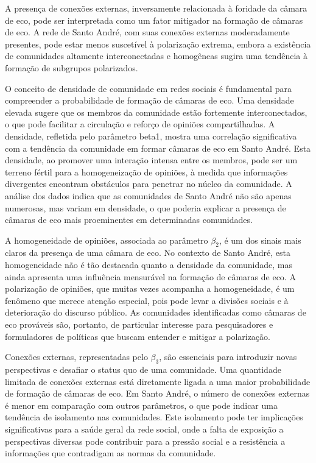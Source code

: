 A presença de conexões externas, inversamente relacionada à foridade da câmara de eco, pode ser interpretada como um fator mitigador na formação de câmaras de eco. A rede de Santo André, com suas conexões externas moderadamente presentes, pode estar menos suscetível à polarização extrema, embora a existência de comunidades altamente interconectadas e homogêneas sugira uma tendência à formação de subgrupos polarizados.

O conceito de densidade de comunidade em redes sociais é fundamental para compreender a probabilidade de formação de câmaras de eco. Uma densidade elevada sugere que os membros da comunidade estão fortemente interconectados, o que pode facilitar a circulação e reforço de opiniões compartilhadas. A densidade, refletida pelo parâmetro beta1, mostra uma correlação significativa com a tendência da comunidade em formar câmaras de eco em Santo André. Esta densidade, ao promover uma interação intensa entre os membros, pode ser um terreno fértil para a homogeneização de opiniões, à medida que informações divergentes encontram obstáculos para penetrar no núcleo da comunidade. A análise dos dados indica que as comunidades de Santo André não são apenas numerosas, mas variam em densidade, o que poderia explicar a presença de câmaras de eco mais proeminentes em determinadas comunidades.

A homogeneidade de opiniões, associada ao parâmetro $\beta_2$, é um dos sinais mais claros da presença de uma câmara de eco. No contexto de Santo André, esta homogeneidade não é tão destacada quanto a densidade da comunidade, mas ainda apresenta uma influência mensurável na formação de câmaras de eco. A polarização de opiniões, que muitas vezes acompanha a homogeneidade, é um fenômeno que merece atenção especial, pois pode levar a divisões sociais e à deterioração do discurso público. As comunidades identificadas como câmaras de eco prováveis são, portanto, de particular interesse para pesquisadores e formuladores de políticas que buscam entender e mitigar a polarização.

Conexões externas, representadas pelo $\beta_3$, são essenciais para introduzir novas perspectivas e desafiar o status quo de uma comunidade. Uma quantidade limitada de conexões externas está diretamente ligada a uma maior probabilidade de formação de câmaras de eco. Em Santo André, o número de conexões externas é menor em comparação com outros parâmetros, o que pode indicar uma tendência de isolamento nas comunidades. Este isolamento pode ter implicações significativas para a saúde geral da rede social, onde a falta de exposição a perspectivas diversas pode contribuir para a pressão social e a resistência a informações que contradigam as normas da comunidade.

